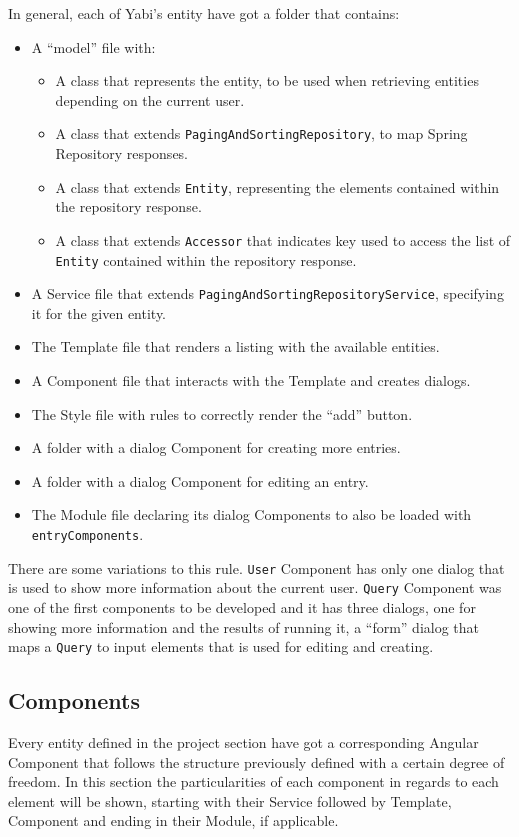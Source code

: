 In general, each of \gls{Yabi}'s entity have got a folder that contains:
\begin{itemize}
\item A ``model'' file with:
  \begin{itemize}
  \item A class that represents the entity, to be used when retrieving entities depending on the current user.
  \item A class that extends \texttt{PagingAndSortingRepository}, to map Spring Repository responses.
  \item A class that extends \texttt{Entity}, representing the elements contained within the repository response.
  \item A class that extends \texttt{Accessor} that indicates key used to access the list of \texttt{Entity} contained within the repository response.
  \end{itemize}
\item A Service file that extends \texttt{PagingAndSortingRepositoryService}, specifying it for the given entity.
\item The Template file that renders a listing with the available entities.
\item A Component file that interacts with the Template and creates dialogs.
\item The Style file with rules to correctly render the ``add'' button.
\item A folder with a dialog Component for creating more entries.
\item A folder with a dialog Component for editing an entry.
\item The Module file declaring its dialog Components to also be loaded with \texttt{entryComponents}.
\end{itemize}

There are some variations to this rule. \texttt{User} Component has only one dialog that is used to show more information about the current user. \texttt{Query} Component was one of the first components to be developed and it has three dialogs, one for showing more information and the results of running it, a ``form'' dialog that maps a \texttt{Query} to input elements that is used for editing and creating.

\subsection{Components}\label{components}
Every entity defined in the project section have got a corresponding Angular Component that follows the structure previously defined with a certain degree of freedom. In this section the particularities of each component in regards to each element will be shown, starting with their Service followed by Template, Component and ending in their Module, if applicable.

